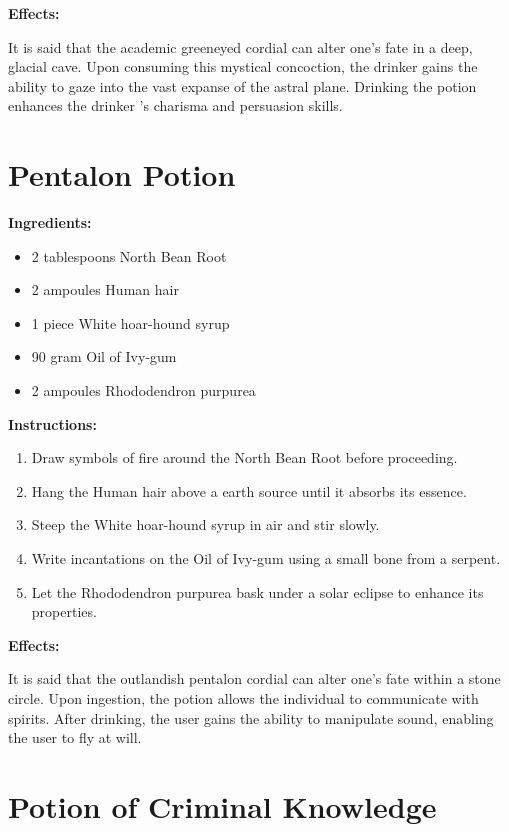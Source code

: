 \documentclass{article}
\begin{document}
\textbf{Effects:}

It is said that the academic greeneyed cordial can alter one's fate in a deep, glacial cave. Upon consuming this mystical concoction, the drinker gains the ability to gaze into the vast expanse of the astral plane. Drinking the potion enhances the drinker 's charisma and persuasion skills.

\newpage
\section*{Pentalon Potion}

\textbf{Ingredients:}

\begin{itemize}
  \item 2 tablespoons North Bean Root
  \item 2 ampoules Human hair
  \item 1 piece White hoar-hound syrup
  \item 90 gram Oil of Ivy-gum
  \item 2 ampoules Rhododendron purpurea
\end{itemize}

\textbf{Instructions:}

\begin{enumerate}
  \item Draw symbols of fire around the North Bean Root before proceeding.
  \item Hang the Human hair above a earth source until it absorbs its essence.
  \item Steep the White hoar-hound syrup in air and stir slowly.
  \item Write incantations on the Oil of Ivy-gum using a small bone from a serpent.
  \item Let the Rhododendron purpurea bask under a solar eclipse to enhance its properties.
\end{enumerate}

\textbf{Effects:}

It is said that the outlandish pentalon cordial can alter one's fate within a stone circle. Upon ingestion, the potion allows the individual to communicate with spirits. After drinking, the user gains the ability to manipulate sound, enabling the user to fly at will.

\newpage
\section*{Potion of Criminal Knowledge}
\end{document}
